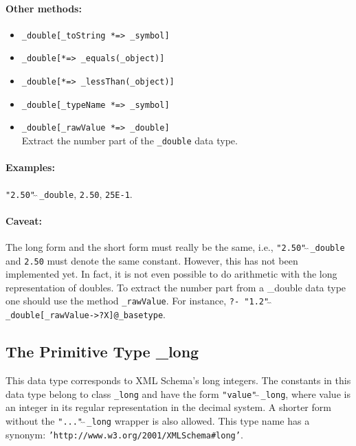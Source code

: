 \documentclass[11pt]{article}
\begin{document}
\paragraph{Other methods:}
\begin{itemize}
\item {\tt \_double[\_toString *=> \_symbol]}
\item {\tt \_double[*=> \_equals(\_object)]}
\item {\tt \_double[*=> \_lessThan(\_object)]}
\item {\tt \_double[\_typeName *=> \_symbol]}
\item {\tt \_double[\_rawValue *=> \_double]}
  \\
  Extract the number part of the {\tt \_double} data type. 
\end{itemize}

\paragraph{Examples:}  {\tt "2.50"$\hat{~}\hat{~}$\_double}, {\tt 2.50},
{\tt 25E-1}.

\paragraph{Caveat:}  The long form and the short form must really be the
same, i.e., {\tt "2.50"$\hat{~}\hat{~}$\_double} and {\tt 2.50}
must denote the same constant.  However, this has not been implemented yet.
In fact, it is not even possible to do arithmetic with the long
representation of doubles. To extract the number part from a \_double data
type one should use the method {\tt \_rawValue}.  For instance,
{\tt ?- "1.2"$\hat{~}\hat{~}$\_double[\_rawValue->?X]@\_basetype}.

\subsection{ The Primitive Type \_long}

This data type corresponds to XML Schema's long integers.
The constants in this data type belong to class {\tt \_long} and have the
form {\tt "value"$\hat{~}\hat{~}$\_long}, where value is an integer in its regular
representation in the decimal system. A shorter form without the
{\tt "..."$\hat{~}\hat{~}$\_long}  wrapper is also allowed.
This type name has a synonym: {\tt 'http://www.w3.org/2001/XMLSchema\#long'}. 
\end{document}
